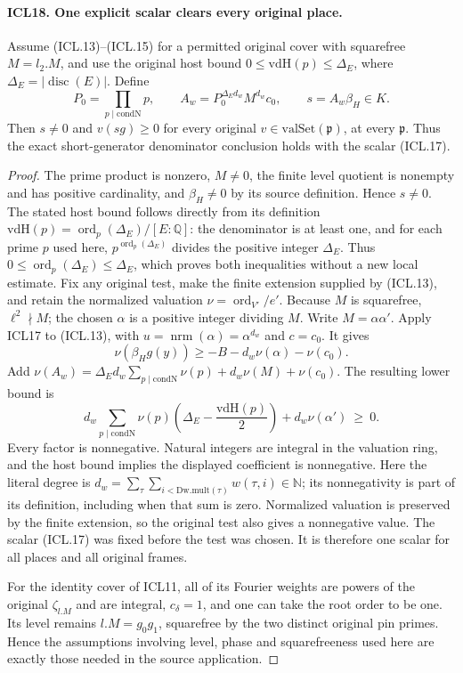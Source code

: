 \documentclass[11pt,a4paper]{article}
\numberwithin{equation}{section}
\theoremstyle{remark}\newtheorem{remark}[theorem]{Remark}
\begin{document}
\paragraph{ICL18. One explicit scalar clears every original place.}
\label{claim:ICL18}
Assume (ICL.13)--(ICL.15) for a permitted original cover
with squarefree \(M=l_2.M\), and use the original host
bound \(0\leq\mathrm{vdH}(p)\leq\Delta_E\), where
\(\Delta_E=|\operatorname{disc}(E)|\).  Define
\[
 P_0=\prod_{p\mid\mathrm{condN}}p,\qquad
 A_w=P_0^{\Delta_E d_w}M^{d_w}c_0,\qquad
 s=A_w\beta_H\in K.                                 \tag{ICL.17}
\]
Then \(s\ne0\) and \(v(sg)\geq0\) for every
original \(v\in\mathrm{valSet}(\mathfrak p)\), at
every \(\mathfrak p\).  Thus the exact short-generator
denominator conclusion holds with the scalar (ICL.17).
\begin{proof}
The prime product is nonzero, \(M\ne0\), the finite
level quotient is nonempty and has positive cardinality,
and \(\beta_H\ne0\) by its source definition.  Hence
\(s\ne0\).  The stated host bound follows directly
from its definition
\(\mathrm{vdH}(p)=\operatorname{ord}_p(\Delta_E)/[E:\mathbb Q]\):
the denominator is at least one, and for each prime
\(p\) used here, \(p^{\operatorname{ord}_p(\Delta_E)}\)
divides the positive integer \(\Delta_E\).  Thus
\(0\leq\operatorname{ord}_p(\Delta_E)\leq\Delta_E\),
which proves both inequalities without a new local
estimate.  Fix any original test, make the finite
extension supplied by (ICL.13), and retain the normalized
valuation \(\nu=\operatorname{ord}_{V'}/e'\).
Because \(M\) is squarefree, \(\ell^2\nmid M\);
the chosen \(\alpha\) is a positive integer dividing
\(M\).  Write \(M=\alpha\alpha'\).
Apply ICL17 to (ICL.13), with
\(u=\operatorname{nrm}(\alpha)=\alpha^{d_w}\)
and \(c=c_0\).  It gives
\[
 \nu(\beta_Hg(y))\geq-B-d_w\nu(\alpha)-\nu(c_0).
\]
Add
\(\nu(A_w)=\Delta_Ed_w\sum_{p\mid\mathrm{condN}}\nu(p)
                  +d_w\nu(M)+\nu(c_0)\).
The resulting lower bound is
\[
 d_w\sum_{p\mid\mathrm{condN}}
        \nu(p)\left(\Delta_E-\frac{\mathrm{vdH}(p)}2\right)
                      +d_w\nu(\alpha')\ \geq\ 0.      \tag{ICL.18}
\]
Every factor is nonnegative.  Natural integers are
integral in the valuation ring, and the host bound
implies the displayed coefficient is nonnegative.
Here the literal degree is
\(d_w=\sum_\tau\sum_{i<\mathrm{Dw.mult}(\tau)}w(\tau,i)\in\mathbb N\);
its nonnegativity is part of its definition, including
when that sum is zero.
Normalized valuation is preserved by the finite
extension, so the original test also gives a
nonnegative value.  The scalar (ICL.17) was fixed
before the test was chosen.  It is therefore one
scalar for all places and all original frames.

For the identity cover of ICL11, all of its Fourier
weights are powers of the original \(\zeta_{l.M}\)
and are integral, \(c_\delta=1\), and one can take
the root order to be one.  Its level remains
\(l.M=g_0g_1\), squarefree by the two distinct
original pin primes.  Hence the assumptions involving
level, phase and squarefreeness used here are exactly
those needed in the source application.
\end{proof}
\end{document}

